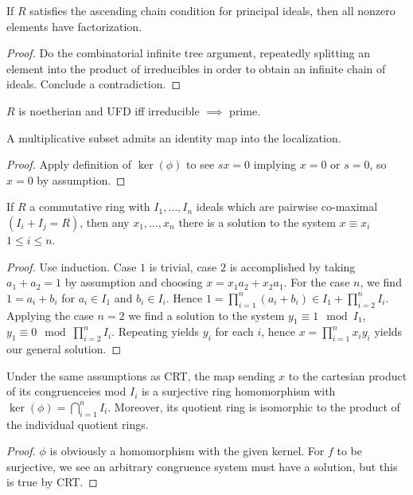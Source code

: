 \begin{theorem}
	If \(R\) satisfies the ascending chain condition for principal ideals, then all nonzero elements have factorization.
\end{theorem}
\begin{proof}
	Do the combinatorial infinite tree argument, repeatedly splitting an element into the product of irreducibles in order to obtain an infinite chain of ideals. Conclude a contradiction.
\end{proof}
\begin{proposition}
	\(R\) is noetherian and UFD iff irreducible \(\implies\) prime.
\end{proposition}
\begin{theorem}
	A multiplicative subset admits an identity map into the localization.
\end{theorem}
\begin{proof}
	Apply definition of \(\ker \left(  \phi\right) \) to see \(sx = 0\) implying \(x = 0\) or \(s = 0\), so \(x = 0\) by assumption.
\end{proof}
\begin{theorem}[CRT]
	If \(R\) a commutative ring with \(I_1, \ldots, I_{n}\) ideals which are pairwise co-maximal \(\left( I_{i} + I_{j} = R\right) \), then any \(x_1, \ldots, x_{n}\) there is a solution to the system \(x \equiv x_{i}\) \(1 \le i \le n\).
\end{theorem}
\begin{proof}
Use induction. Case \(1\) is trivial, case \(2\) is accomplished by taking \(a_1 + a_2 = 1\) 	by assumption and choosing \(x = x_1 a_2 + x_2 a_1\). For the case \(n\), we find \(1 = a_{i} + b_{i}\) for \(a_{i} \in I_1\) and \(b_{i} \in I_{i}\). Hence \(1 = \prod_{i= 1}^{n} \left( a_{i} + b_{i} \right) \in I_1 + \prod_{i=2}^{n} I_{i}   \).\\
Applying the case \(n = 2\) we find a solution to the system \(y_1 \equiv 1 \mod I_1\), \(y_1 \equiv 0 \mod \prod_{i=2}^{n} I_{i} \). Repeating yields \(y_{i}\) for each \(i\), hence \(x = \prod_{i= 1}^{n} x_{i} y_{i} \) yields our general solution.
\end{proof}
\begin{theorem}
	Under the same assumptions as CRT, the map sending \(x\) to the cartesian product of its congruenceies mod \(I_{i}\) is a surjective ring homomorphism with \(\ker \left( \phi \right)  = \bigcap_{i=1} ^{n} I_{i}\). Moreover, its quotient ring is isomorphic to the product of the individual quotient rings.
\end{theorem}
\begin{proof}
	\(\phi\) is obviously a homomorphism with the given kernel. For \(f\) to be surjective, we see an arbitrary congruence system must have a solution, but this is true by CRT.
\end{proof}

